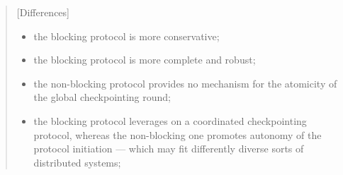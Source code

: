 \documentclass[11pt, a4paper]{article}
\begin{document}
\begin{quote}[Differences]{}
    \begin{itemize}
        \item the blocking protocol is more conservative;
        \item the blocking protocol is more complete and robust;
        \item the non-blocking protocol provides no mechanism for the atomicity of the global checkpointing round;
        \item the blocking protocol leverages on a coordinated checkpointing protocol, whereas the non-blocking one promotes autonomy of the protocol initiation --- which may fit differently diverse sorts of distributed systems;
    \end{itemize}
\end{quote}
%
\end{document}
